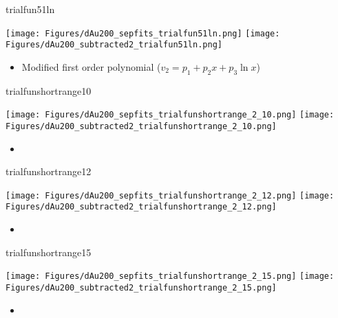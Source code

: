 \documentclass[aspectratio=169,compress,10pt]{beamer}
\begin{document}
\begin{frame}{trialfun51ln}
\begin{center}
\texttt{[image: Figures/dAu200\_sepfits\_trialfun51ln.png]}
\texttt{[image: Figures/dAu200\_subtracted2\_trialfun51ln.png]}
\end{center}
\begin{itemize}
\item Modified first order polynomial ($v_2 = p_1 + p_2x + p_3\ln x$)
\end{itemize}
\end{frame}



\begin{frame}{trialfunshortrange10}
\begin{center}
\texttt{[image: Figures/dAu200\_sepfits\_trialfunshortrange\_2\_10.png]}
\texttt{[image: Figures/dAu200\_subtracted2\_trialfunshortrange\_2\_10.png]}
\end{center}
\begin{itemize}
\item %
\end{itemize}
\end{frame}



\begin{frame}{trialfunshortrange12}
\begin{center}
\texttt{[image: Figures/dAu200\_sepfits\_trialfunshortrange\_2\_12.png]}
\texttt{[image: Figures/dAu200\_subtracted2\_trialfunshortrange\_2\_12.png]}
\end{center}
\begin{itemize}
\item %
\end{itemize}
\end{frame}



\begin{frame}{trialfunshortrange15}
\begin{center}
\texttt{[image: Figures/dAu200\_sepfits\_trialfunshortrange\_2\_15.png]}
\texttt{[image: Figures/dAu200\_subtracted2\_trialfunshortrange\_2\_15.png]}
\end{center}
\begin{itemize}
\item %
\end{itemize}
\end{frame}
\end{document}
